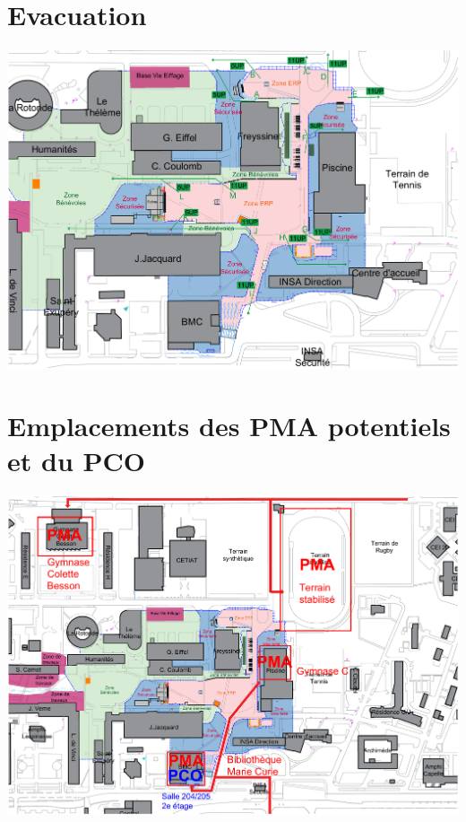 \documentclass[hidelinks, paper=a4, fontsize=13pt]{report}
\begin{document}
\section{Evacuation}
	\begin{center}\includegraphics[width=.95\textheight,angle=90]{Exports/Plan_24h_44eme-IS}\end{center}


\section{Emplacements des PMA potentiels et du PCO}
	\begin{center}\includegraphics[width=.95\textheight,angle=90]{Exports/Plan_24h_44eme-PCO_PMA}\end{center}
\end{document}
